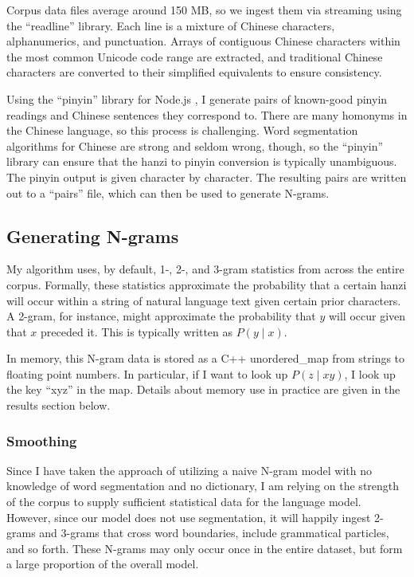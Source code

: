 \documentclass[11pt]{ctexart}
\begin{document}
Corpus data files average around 150 MB, so we ingest them via streaming 
using the ``readline''  library. Each line is a
mixture of Chinese characters, alphanumerics, and punctuation. 
Arrays of contiguous Chinese characters within the most common Unicode
code range are extracted, and traditional Chinese characters are converted to their 
simplified equivalents to ensure consistency. 

Using the ``pinyin'' library for Node.js \cite{pinyingithub}, 
I generate pairs of known-good pinyin readings 
and Chinese sentences they correspond to. There are many homonyms in the Chinese language,
so this process is challenging. Word segmentation algorithms for Chinese are strong
and seldom wrong, though, so the ``pinyin'' library can ensure that the 
hanzi to pinyin conversion is typically unambiguous. 
The pinyin output is given character by character.
The resulting pairs are written out to a ``pairs'' file, which can 
then be used to generate N-grams. 

\subsection{Generating N-grams}

My algorithm uses, by default, 1-, 2-, and 3-gram statistics
from across the entire corpus. Formally, these statistics approximate
the probability that a certain hanzi will occur within a string
of natural language text given certain prior characters. A 2-gram,
for instance, might approximate the probability that $y$ will
occur given that $x$ preceded it. This is typically written as
$P(y \mid x)$. 

In memory, this N-gram data is stored as a C++ unordered\_map
from strings to floating point numbers. In particular, if I want
to look up $P(z \mid xy)$, I look up the key ``xyz'' in the map.
Details about memory use in practice are given in the results
section below.

\subsubsection{Smoothing}

Since I have taken the approach of utilizing a naive N-gram model
with no knowledge of word segmentation and no dictionary, I am relying 
on the strength of the corpus to supply sufficient statistical data for
the language model. However, since our model does not use segmentation, 
it will happily ingest 2-grams and 3-grams that cross word boundaries, 
include grammatical particles, and so forth. These N-grams may only occur
once in the entire dataset, but form a large proportion of the overall
model. 
\end{document}
